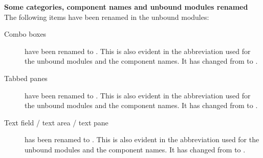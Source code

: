 \textbf{Some categories, component names and unbound modules renamed}
The following items have been renamed in the unbound modules:
\begin{description}
\item [Combo boxes]{ have been renamed to . This is also evident in the abbreviation used for the unbound modules and the component names. It has changed from  to .}
\item [Tabbed panes]{ have been renamed to . This is also evident in the abbreviation used for the unbound modules and the component names. It has changed from  to .}
\item [Text field / text area / text pane]{ has been renamed to . This is also evident in the abbreviation used for the unbound modules and the component names. It has changed from  to .}
\end{description}

